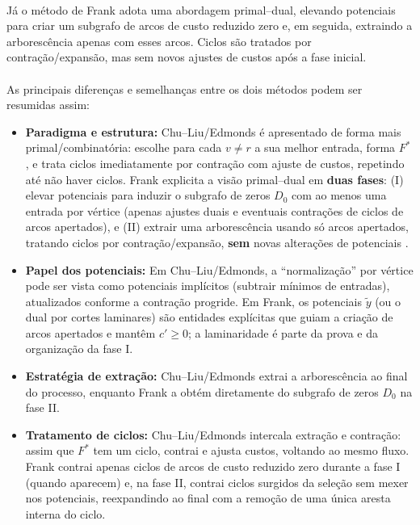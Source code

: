 \documentclass[12pt,a4paper]{article}
\def\emph#1{#1}%
\begin{document}
\paragraph{}
Já o método de Frank \cite{frank1981,frank2014} adota uma abordagem primal–dual, elevando potenciais para criar um subgrafo de arcos de custo reduzido zero e, em seguida, extraindo a arborescência apenas com esses arcos. Ciclos são tratados por contração/expansão, mas sem novos ajustes de custos após a fase inicial.

\paragraph{}
As principais diferenças e semelhanças entre os dois métodos podem ser resumidas assim:

\begin{itemize}\setlength{\itemsep}{2pt}
    \item \textbf{Paradigma e estrutura:} \emph{Chu–Liu/Edmonds} é apresentado de forma mais \emph{primal/combinatória}: escolhe para cada \(v\neq r\) a sua melhor entrada, forma \(F^*\), e trata ciclos imediatamente por contração com ajuste de custos, repetindo até não haver ciclos.
          \emph{Frank} explicita a visão \emph{primal–dual} em \textbf{duas fases}: (I) elevar potenciais para induzir o subgrafo de zeros \(D_0\) com ao menos uma entrada por vértice (apenas ajustes duais e eventuais contrações de ciclos de arcos apertados), e (II) extrair uma arborescência usando \emph{só} arcos apertados, tratando ciclos por contração/expansão, \textbf{sem} novas alterações de potenciais \cite{frank1981,frank2014,schrijver2003comb}.

    \item \textbf{Papel dos potenciais:} Em \emph{Chu–Liu/Edmonds}, a “normalização” por vértice pode ser vista como potenciais \emph{implícitos} (subtrair mínimos de entradas), atualizados conforme a contração progride. Em \emph{Frank}, os potenciais \(\tilde y\) (ou o dual por cortes laminares) são entidades \emph{explícitas} que guiam a criação de arcos apertados e mantêm \(c'\ge 0\); a laminaridade é parte da prova e da organização da fase I.

    \item \textbf{Estratégia de extração:} \emph{Chu–Liu/Edmonds} extrai a arborescência ao final do processo, enquanto \emph{Frank} a obtém diretamente do subgrafo de zeros \(D_0\) na fase II.

    \item \textbf{Tratamento de ciclos:} \emph{Chu–Liu/Edmonds} intercala extração e contração: assim que \(F^*\) tem um ciclo, contrai e ajusta custos, voltando ao mesmo fluxo. \emph{Frank} contrai apenas ciclos de arcos de custo reduzido zero durante a fase I (quando aparecem) e, na fase II, contrai ciclos surgidos da seleção \emph{sem} mexer nos potenciais, reexpandindo ao final com a remoção de uma única aresta interna do ciclo.


\end{itemize}
\end{document}
